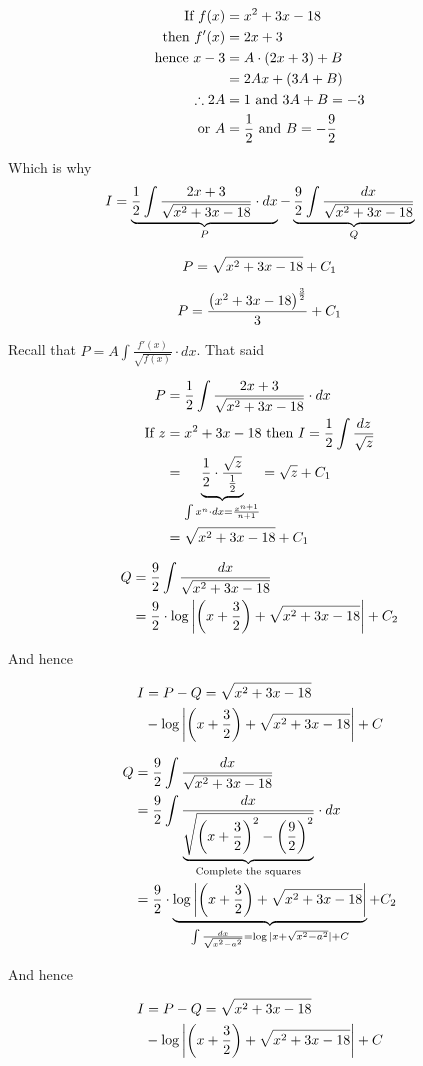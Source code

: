 \documentclass[14pt,fleqn]{extarticle}
\begin{document}
\newcard 

\begin{align}
\text{If }f(x) &= x^2 + 3x-18 \\
\text{then }f'(x) &= 2x + 3 \\
\text{hence }x-3 &= A\cdot \left(2x+3 \right) + B \\ 
&= 2Ax + \left(3A + B \right) \\
\therefore 2A &= 1\text{ and } 3A + B = -3 \\
\text{or } A &= \frac{1}{2}\text{ and } B = -\frac{9}{2}
\end{align}

Which is why 
\small\[ I = \underbrace{\frac{1}{2}\int \frac{2x+3}{\sqrt{x^2 + 3x-18}}\cdot dx}_P - \underbrace{\frac{9}{2}\int \frac{dx}{\sqrt{x^2 + 3x-18}}}_Q \]\normalsize

\newcard 

\[ P = \sqrt{x^2 + 3x-18}  + C_1 \]

\newcard 

\[ P = \frac{\left(x^2 + 3x-18 \right)^{\frac{3}{2}}}{3} + C_1 \]

\newcard 

Recall that $P= A\int \frac{f'(x)}{\sqrt{f(x)}}\cdot dx$. That said 

\begin{align}
	P &= \frac{1}{2}\int \frac{2x+3}{\sqrt{x^2 + 3x-18}}\cdot dx \\
	\text{If } z &= x^2 + 3x-18\text{ then } I = \frac{1}{2}\int \frac{dz}{\sqrt{z}} \\
	&= \underbrace{\frac{1}{2}\cdot \frac{\sqrt{z}}{\frac{1}{2}}}_{\int x^n\cdot dx = \frac{x^{n+1}}{n+1}} = \sqrt{z} + C_1 \\
	&= \sqrt{x^2 + 3x-18} + C_1 
\end{align}

\newcard 

\begin{align}
	Q &= \frac{9}{2}\int \frac{dx}{\sqrt{x^2 + 3x-18}} \\
	&= \frac{9}{2}\cdot \log \left\vert \left(x+\frac{3}{2} \right) + \sqrt{x^2 + 3x-18} \right\vert + C_2
\end{align}

And hence 

\begin{align}
I &= P - Q = \sqrt{x^2 + 3x-18} \\
&- \log\left\vert\left(x+\frac{3}{2} \right) + \sqrt{x^2 + 3x-18}\right\vert + C 
\end{align}

\newcard 

\begin{align}
	Q &= \frac{9}{2}\int \frac{dx}{\sqrt{x^2 + 3x-18}} \\
	&= \frac{9}{2} \int \frac{dx}{\underbrace{\sqrt{\left(x+\frac{3}{2} \right)^2 - \left(\frac{9}{2} \right)^2}}_{\text{Complete the squares}}}\cdot dx \\
	&= \frac{9}{2}\cdot \underbrace{\log \left\vert \left(x+\frac{3}{2} \right) + \sqrt{x^2 + 3x-18} \right\vert}_{\int \frac{dx}{\sqrt{x^2-a^2}} = \log\vert x + \sqrt{x^2-a^2}\vert +C } + C_2
\end{align}

And hence 

\begin{align}
I &= P - Q =  \sqrt{x^2 + 3x-18} \\
&- \log\left\vert\left(x+\frac{3}{2} \right) + \sqrt{x^2 + 3x-18}\right\vert + C 
\end{align}
\end{document}
